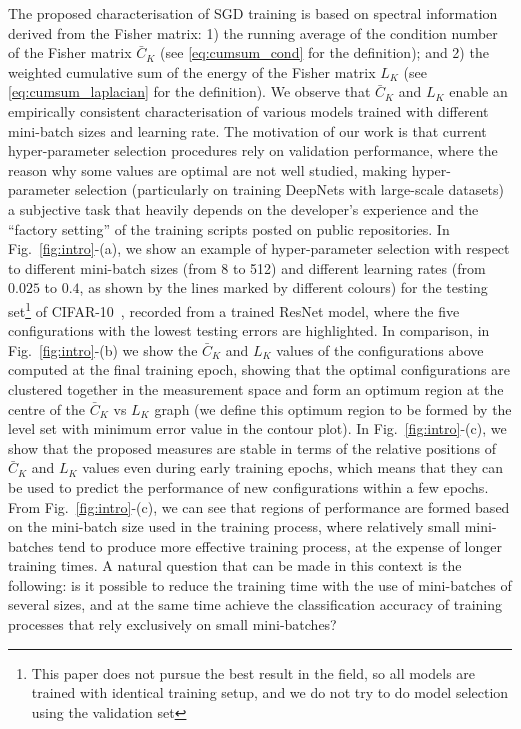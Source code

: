 \documentclass[10pt,journal,compsoc]{IEEEtran}
\begin{document}
The proposed characterisation of SGD training is based on spectral information derived from the Fisher matrix: 1) the running average of the condition number of the Fisher matrix $\bar{C}_K$  (see \eqref{eq:cumsum_cond} for the definition); and 2) the weighted cumulative sum of the energy of the Fisher matrix $L_K$ (see \eqref{eq:cumsum_laplacian} for the definition).
We observe that $\bar{C}_K$ and $L_K$ enable an empirically consistent characterisation of various models trained with different mini-batch sizes and learning rate.
The motivation of our work is that current hyper-parameter selection procedures rely on validation performance, where the reason why some values are optimal are not well studied, making hyper-parameter selection (particularly on training DeepNets with large-scale datasets) a subjective task that heavily depends on the developer's experience and the ``factory setting'' of the training scripts posted on public repositories.
In Fig.~\ref{fig:intro}-(a), we show an example of hyper-parameter selection with respect to different mini-batch sizes (from 8 to 512) and different learning rates (from $0.025$ to $0.4$, as shown by the lines marked by different colours) for the testing set\footnote{This paper does not pursue the best result in the field, so all models are trained with identical training setup, and we do not try to do model selection using the validation set} of CIFAR-10~\cite{krizhevsky2009learning}, recorded from a trained ResNet model, where the five configurations with the lowest testing errors are highlighted.
In comparison, in Fig.~\ref{fig:intro}-(b) we show the $\bar{C}_K$ and $L_K$ values of the configurations above computed at the final training epoch, showing that the optimal configurations are clustered together in the measurement space and form an optimum region at the centre of the $\bar{C}_K$ vs $L_K$ graph (we define this optimum region to be formed by the level set with minimum error value in the contour plot).
In Fig.~\ref{fig:intro}-(c), we show that the proposed measures are stable in terms of the relative positions of $\bar{C}_K$ and $L_K$ values even during early training epochs, which means that they can be used to predict the performance of new configurations within a few epochs.
From Fig.~\ref{fig:intro}-(c), we can see that regions of performance are formed based on the mini-batch size used in the training process, where relatively small mini-batches tend to produce more effective training process, at the expense of longer training times.  A natural question that can be made in this context is the following: is it possible to reduce the training time with the use of mini-batches of several sizes, and at the same time achieve the classification accuracy of training processes that rely exclusively on small mini-batches?
\end{document}
